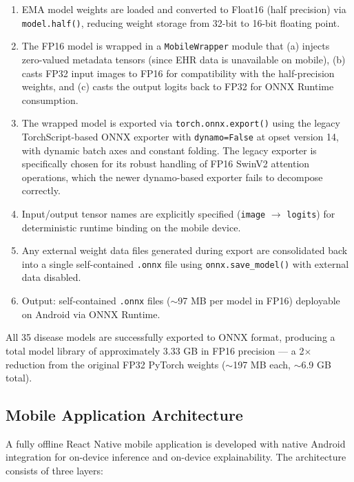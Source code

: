 \documentclass[12pt,a4paper]{report}
\begin{document}
\begin{enumerate}
    \item EMA model weights are loaded and converted to Float16 (half precision) via \texttt{model.half()}, reducing weight storage from 32-bit to 16-bit floating point.
    \item The FP16 model is wrapped in a \texttt{MobileWrapper} module that (a) injects zero-valued metadata tensors (since EHR data is unavailable on mobile), (b) casts FP32 input images to FP16 for compatibility with the half-precision weights, and (c) casts the output logits back to FP32 for ONNX Runtime consumption.
    \item The wrapped model is exported via \texttt{torch.onnx.export()} using the legacy TorchScript-based ONNX exporter with \texttt{dynamo=False} at opset version 14, with dynamic batch axes and constant folding. The legacy exporter is specifically chosen for its robust handling of FP16 SwinV2 attention operations, which the newer dynamo-based exporter fails to decompose correctly.
    \item Input/output tensor names are explicitly specified (\texttt{image} $\rightarrow$ \texttt{logits}) for deterministic runtime binding on the mobile device.
    \item Any external weight data files generated during export are consolidated back into a single self-contained \texttt{.onnx} file using \texttt{onnx.save\_model()} with external data disabled.
    \item Output: self-contained \texttt{.onnx} files ($\sim$97 MB per model in FP16) deployable on Android via ONNX Runtime.
\end{enumerate}

All 35 disease models are successfully exported to ONNX format, producing a total model library of approximately 3.33 GB in FP16 precision --- a 2$\times$ reduction from the original FP32 PyTorch weights ($\sim$197 MB each, $\sim$6.9 GB total).

\subsection{Mobile Application Architecture}

A fully offline React Native mobile application is developed with native Android integration for on-device inference and on-device explainability. The architecture consists of three layers:
\end{document}
